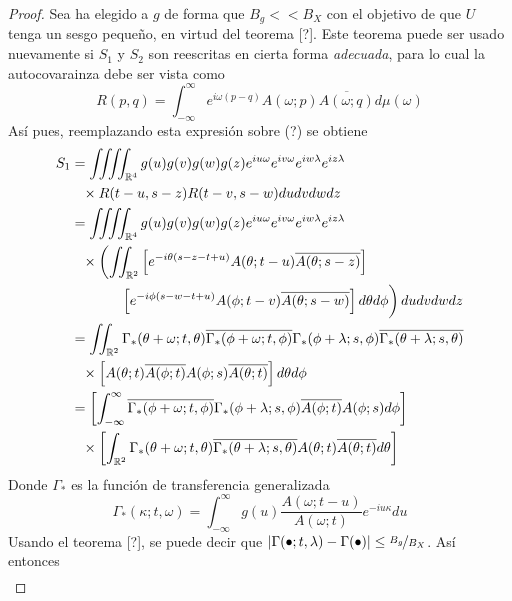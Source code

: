 \documentclass[12pt,letterpaper]{book}
\newcommand{\R}{\mathbb{R}}
\newcommand{\intR}{\int_{-\infty}^{\infty}}
\newcommand{\abso}[1]{\left| #1 \right|}
\newcommand{\pheq}{\phantom{=}}
\begin{document}
\begin{proof}
Sea ha elegido a $g$ de forma que $B_g << B_X$ con el objetivo de que $U$ tenga un sesgo pequeño, en virtud del teorema [?]. Este teorema puede ser usado nuevamente si $S_1$ y $S_2$ son reescritas en cierta forma \textit{adecuada}, para lo cual la autocovarainza debe ser vista como
\begin{equation}
R(p,q) = \intR e^{i \omega (p-q)} A(\omega; p)\overline{A(\omega; q)} d\mu(\omega) 
\end{equation}
Así pues, reemplazando esta expresión sobre (?) se obtiene
\begin{align*}
S_1 &=
\iiiint_{\R^{4}} g(u) g(v) g(w) g(z) e^{i u \omega} e^{i v \omega} e^{i w \lambda} e^{i z \lambda} \\
&\pheq \times R(t-u,s-z)R(t-v,s-w) du dv dw dz \\
&= 
\iiiint_{\R^{4}} g(u) g(v) g(w) g(z) e^{i u \omega} e^{i v \omega} e^{i w \lambda} e^{i z \lambda} \\
&\pheq \times \left( 
\iint_{\R^{2}} 
\left[ 
e^{-i \theta (s-z-t+u)} A(\theta; t-u) \overline{A(\theta; s-z)} 
\right] 
\right. \\
&\pheq 
\left. \vphantom{\int} \phantom{times}
\left[ e^{-i \phi (s-w-t+u)} A(\phi; t-v) \overline{A(\theta; s-w)} \right] d\theta d\phi
\right) du dv dw dz
\\
 &= \iint_{\R^{2}} \Gamma_*(\theta+ \omega; t, \theta) \overline{\Gamma_*(\phi + \omega; t, \phi)}
 \Gamma_*(\phi+ \lambda; s, \phi) \overline{\Gamma_*(\theta + \lambda; s, \theta)} \\
 &\pheq \times
 \left[
 A(\theta; t) \overline{A(\phi; t)} A(\phi; s) \overline{A(\theta; t)}
 \right] d\theta d\phi
\\
 &= \left[ \intR \overline{\Gamma_*(\phi + \omega; t, \phi)} \Gamma_*(\phi+ \lambda; s, \phi)
 \overline{A(\phi; t)} A(\phi; s) d\phi \right] \\
 &\pheq \times \left[ \int_{\R^{2}} \Gamma_*(\theta+ \omega; t, \theta) 
  \overline{\Gamma_*(\theta + \lambda; s, \theta)}  
 A(\theta; t)   \overline{A(\theta; t)} d\theta \right] 
\end{align*}
Donde $\Gamma_*$ es la función de transferencia generalizada
\begin{equation}
\Gamma_*(\kappa; t, \omega) = \intR g(u) \frac{A(\omega; t-u)}{A(\omega; t)} e^{-i u \kappa} du
\end{equation}
Usando el teorema [?], se puede decir que $\abso{\Gamma(\bullet; t, \lambda) - \Gamma(\bullet)} \leq \nicefrac{B_g}{B_X}$. Así entonces
\begin{align*}

\end{align*}
\end{proof}
\end{document}
